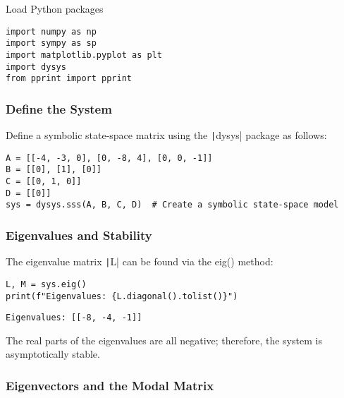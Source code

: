 \label{72b9b0a6}
Load Python packages

\label{457e325e}
\nointerlineskip\nointerlineskip\begin{verbatim}
import numpy as np
import sympy as sp
import matplotlib.pyplot as plt
import dysys
from pprint import pprint
\end{verbatim}

\label{31f2d103}

\label{c52bb6f0}
\subsubsection{Define the System}\label{define-the-system}

Define a symbolic state-space matrix using the \texttt|dysys|
package as follows:

\label{31f1c682}
\nointerlineskip\nointerlineskip\begin{verbatim}
A = [[-4, -3, 0], [0, -8, 4], [0, 0, -1]]
B = [[0], [1], [0]]
C = [[0, 1, 0]]
D = [[0]]
sys = dysys.sss(A, B, C, D)  # Create a symbolic state-space model
\end{verbatim}

\label{9ec9f9a9}
\subsubsection{Eigenvalues and
Stability}\label{eigenvalues-and-stability}

The eigenvalue matrix \texttt|L| can be found via the eig()
method:

\label{ed6af269}
\nointerlineskip\nointerlineskip\begin{verbatim}
L, M = sys.eig()
print(f"Eigenvalues: {L.diagonal().tolist()}")
\end{verbatim}

\nointerlineskip\nointerlineskip\begin{verbatim}
Eigenvalues: [[-8, -4, -1]]
\end{verbatim}

\label{f9608925}
The real parts of the eigenvalues are all negative; therefore, the
system is asymptotically stable.

\label{bf655b6a}
\subsubsection{Eigenvectors and the Modal
Matrix}\label{eigenvectors-and-the-modal-matrix}

